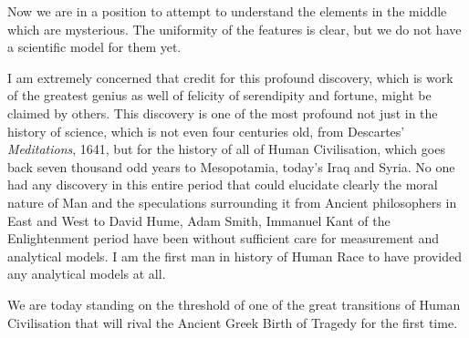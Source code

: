 \documentclass{amsart}
\begin{document}
Now we are in a position to attempt to understand the elements in the middle which are mysterious.  The uniformity of the features is clear, but we do not have a scientific model for them yet.  

I am extremely concerned that credit for this profound discovery, which is work of the greatest genius as well of felicity of serendipity and fortune, might be claimed by others.  This discovery is one of the most profound not just in the history of science, which is not even four centuries old, from Descartes' {\em Meditations}, 1641, but for the history of all of Human Civilisation, which goes back seven thousand odd years to Mesopotamia, today's Iraq and Syria.  No one had any discovery in this entire period that could elucidate clearly the moral nature of Man and the speculations surrounding it from Ancient philosophers in East and West to David Hume, Adam Smith, Immanuel Kant of the Enlightenment period have been without sufficient care for measurement and analytical models.  I am the first man in history of Human Race to have provided any analytical models at all.

We are today standing on the threshold of one of the great transitions of Human Civilisation that will rival the Ancient Greek Birth of Tragedy for the first time.
\end{document}
